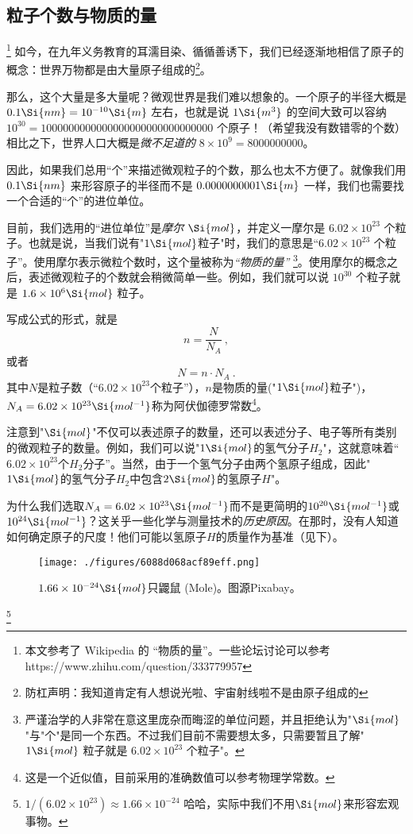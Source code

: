 
\subsection{粒子个数与物质的量}
\footnote{本文参考了 Wikipedia 的 “物质的量”。一些论坛讨论可以参考 https://www.zhihu.com/question/333779957}
如今，在九年义务教育的耳濡目染、循循善诱下，我们已经逐渐地相信了原子的概念：世界万物都是由大量原子组成的\footnote{防杠声明：我知道肯定有人想说光啦、宇宙射线啦不是由原子组成的}。

那么，这个大量是多大量呢？微观世界是我们难以想象的。一个原子的半径大概是 $0.1 \Si{nm} = 10^{-10} \Si{m}$ 左右，也就是说 $1 \Si{m^3}$ 的空间大致可以容纳 $10^{30}=1000000000000000000000000000000$ 个原子！（希望我没有数错零的个数）相比之下，世界人口大概是\textsl{微不足道的} $8\times 10^9=8000000000$。

因此，如果我们总用“个”来描述微观粒子的个数，那么也太不方便了。就像我们用 $0.1 \Si{nm}$ 来形容原子的半径而不是 $0.0000000001 \Si{m}$ 一样，我们也需要找一个合适的“个”的进位单位。

目前，我们选用的“进位单位”是\textsl{摩尔 $\Si{mol}$}，并定义一摩尔是 $6.02\times 10^{23}$ 个粒子。也就是说，当我们说有"$1 \Si{mol}$粒子"时，我们的意思是“$6.02\times 10^{23}$ 个粒子”。使用摩尔表示微粒个数时，这个量被称为\textsl{“物质的量”} \footnote{严谨治学的人非常在意这里庞杂而晦涩的单位问题，并且拒绝认为"$\Si{mol}$"与"个"是同一个东西。不过我们目前不需要想太多，只需要暂且了解"$1 \Si{mol}$ 粒子就是 $6.02\times 10^{23}$ 个粒子"。}。使用摩尔的概念之后，表述微观粒子的个数就会稍微简单一些。例如，我们就可以说 $10^{30}$ 个粒子就是 $1.6\times 10^6 \Si{mol}$ 粒子。

写成公式的形式，就是
$$n=\frac{N}{N_A}~,$$
或者
$$N=n \cdot N_A~.$$
其中$N$是粒子数（“$6.02\times 10^{23}$个粒子”），$n$是物质的量("$1 \Si{mol}$粒子")，$N_A = 6.02\times 10^{23} \Si{mol^{-1}}$称为阿伏伽德罗常数\footnote{这是一个近似值，目前采用的准确数值可以参考物理学常数。}。

注意到"$\Si{mol}$"不仅可以表述原子的数量，还可以表述分子、电子等所有类别的微观粒子的数量。例如，我们可以说"$1\Si{mol}$的氢气分子$H_2$"，这就意味着“$6.02\times 10^{23}$个$H_2$分子”。当然，由于一个氢气分子由两个氢原子组成，因此"$1\Si{mol}$的氢气分子$H_2$中包含$2\Si{mol}$的氢原子$H$"。

为什么我们选取$N_A = 6.02\times 10^{23} \Si{mol^{-1}}$而不是更简明的$10^{20} \Si{mol^{-1}}$或$10^{24} \Si{mol^{-1}}$？这关乎一些化学与测量技术的\textsl{历史原因}。在那时，没有人知道如何确定原子的尺度！他们可能以氢原子$H$的质量作为基准（见下）。
\begin{figure}[ht]
\centering
\texttt{[image: ./figures/6088d068acf89eff.png]}
\caption{$1.66\times10^{-24} \Si{mol}$只鼹鼠 (Mole)。图源Pixabay。} \label{fig_MOLE_1}
\end{figure}\footnote{$1/(6.02\times10^{23}) \approx 1.66\times10^{-24}$ 哈哈，实际中我们不用$\Si{mol}$来形容宏观事物。}


